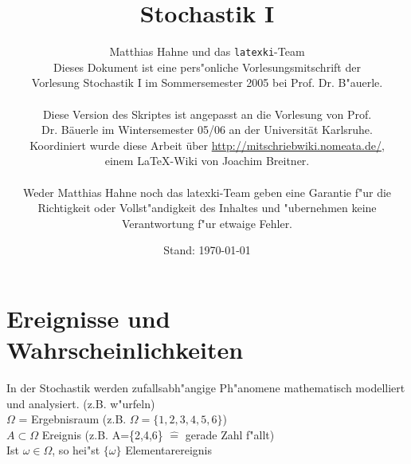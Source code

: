 \documentclass[a4paper,11pt]{book}
\title{Stochastik I}
\author{Matthias Hahne und das \texttt{latexki}-Team\\[8 cm]
Dieses Dokument ist eine pers"onliche Vorlesungsmitschrift der \\
Vorlesung Stochastik I im Sommersemester 2005 bei Prof. Dr. B"auerle. \\
\\
Diese Version des Skriptes ist angepasst an die Vorlesung von Prof.\\
Dr. Bäuerle im Wintersemester 05/06 an der Universität Karlsruhe.\\
Koordiniert wurde diese Arbeit über \url{http://mitschriebwiki.nomeata.de/},\\
einem \LaTeX-Wiki von Joachim Breitner.\\
\\
Weder Matthias Hahne noch das latexki-Team geben eine Garantie f"ur die \\
Richtigkeit oder Vollst"andigkeit des Inhaltes und "ubernehmen keine\\
Verantwortung f"ur etwaige Fehler.
}
\date{Stand: \today}
\theoremstyle{nonumberplain}
\begin{document}
\thispagestyle{empty}
\maketitle
\newpage
\thispagestyle{empty}
\tableofcontents
\thispagestyle{empty}

\chapter{Ereignisse und Wahrscheinlichkeiten}

\setcounter{page}{1}
In der Stochastik werden zufallsabh"angige Ph"anomene mathematisch modelliert und analysiert. (z.B. w"urfeln)\\
$\Omega$ = Ergebnisraum (z.B. $\Omega = \{1,2,3,4,5,6\}$)\\
$A\subset \Omega$ Ereignis (z.B. A=\{2,4,6\} $\hat{=}$  gerade Zahl f"allt)\\
Ist $\omega \in \Omega$, so hei"st $\{\omega\}$ Elementarereignis
\end{document}
